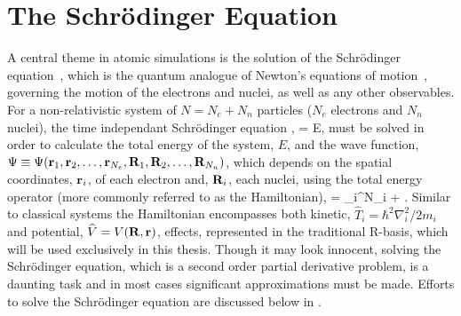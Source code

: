 \section{The Schr\"odinger Equation}
\label{sec:schrodinger}

A central theme in atomic simulations is the solution of the Schr\"odinger equation~\cite{schrodinger-equation-1926}, which is the quantum analogue of Newton's equations of motion~\cite{newton-latin}, governing the motion of the electrons and nuclei, as well as any other observables.
For a non-relativistic system of $N = N_e + N_n$ particles ($N_e$ electrons and $N_n$ nuclei), the time independant Schr\"odinger equation ,
 \Psi = E\Psi,
\eeq
must be solved in order to calculate the total energy of the system, $E$, and the wave function, $\Psi \equiv \Psi({\mathrm{\mathbf{\bm{r}}}}_1, {\mathrm{\mathbf{\bm{r}}}}_2, \ldots, {\mathrm{\mathbf{\bm{r}}}}_{N_e}, {\mathrm{\mathbf{\bm{R}}}}_1, {\mathrm{\mathbf{\bm{R}}}}_2, \ldots, {\mathrm{\mathbf{\bm{R}}}}_{N_n})$, which depends on the spatial coordinates, ${\mathrm{\mathbf{\bm{r}}}}_i$, of each electron and, ${\mathrm{\mathbf{\bm{R}}}}_i$, each nuclei, using the total energy operator (more commonly referred to as the Hamiltonian),
 = \sum_i^{N}_i  + .
\eeq
Similar to classical systems the Hamiltonian encompasses both kinetic, $\widehat{T}_i = \hbar^2\nabla_i^2/2m_i$ and potential, $\widehat{V} = V({\mathrm{\mathbf{\bm{R}}}}, {\mathrm{\mathbf{\bm{r}}}})$, effects, represented in the traditional R-basis, which will be used exclusively in this thesis.
Though it may look innocent, solving the Schr\"odinger equation, which is a second order partial derivative problem, is a daunting task and in most cases significant approximations must be made.
Efforts to solve the Schr\"odinger equation are discussed below in .
